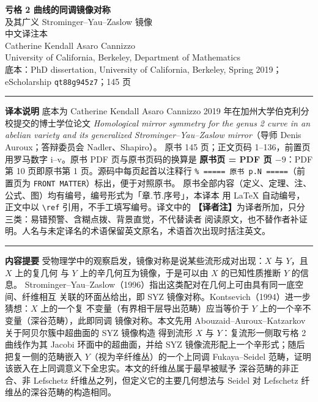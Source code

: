 



\begin{center}
  {\LARGE\bfseries 亏格 2 曲线的同调镜像对称}\\[0.6em]
  {\large 及其广义 Strominger--Yau--Zaslow 镜像}\\[1.0em]
  {\large 中文译注本}\\[1.0em]
  {\large Catherine Kendall Asaro Cannizzo}\\[0.3em]
  {\small University of California, Berkeley, Department of Mathematics}\\[1.0em]
  {\small 底本：PhD dissertation, University of California, Berkeley, Spring 2019；\\
  eScholarship \texttt{qt88g945z7}；145 页}
\end{center}

\vspace{0.6em}
\noindent\rule{\textwidth}{0.4pt}
\begin{minipage}{\textwidth}
\small
\textbf{译本说明}\quad
底本为 Catherine Kendall Asaro Cannizzo 2019 年在加州大学伯克利分校提交的博士学位论文
\emph{Homological mirror symmetry for the genus 2 curve in an abelian variety and its
generalized Strominger--Yau--Zaslow mirror}（导师 Denis Auroux；答辩委员会 Nadler、Shapiro）。
原书 145 页；正文页码 1--136，前置页用罗马数字 i--v。原书 PDF 页与原书页码的换算是
\textbf{原书页 = PDF 页 $-9$}：PDF 第 10 页即原书第 1 页。源码中每页起首以注释行
\texttt{\% ===== 原书 p.N =====}（前置页为 \texttt{FRONT MATTER}）标出，便于对照原书。
原书全部内容（定义、定理、注、公式、图）均有编号，编号形式为「章.节.序号」，本译本
用 \LaTeX{} 自动编号，正文中以 \verb|\ref| 引用，不手工填写编号。译文中的
\textbf{【译者注】}为译者所加，只分三类：易错预警、含糊点拨、背景直觉，不代替读者
阅读原文，也不替作者补证明。人名与未定译名的术语保留英文原名，术语首次出现时括注英文。
\end{minipage}
\noindent\rule{\textwidth}{0.4pt}

\vspace{1.2em}
\noindent\textbf{内容提要}\quad
受物理学中的观察启发，镜像对称是说某些流形成对出现：$X$ 与 $Y$，且 $X$ 上的复几何
与 $Y$ 上的辛几何互为镜像，于是可以由 $X$ 的已知性质推断 $Y$ 的信息。
Strominger--Yau--Zaslow（1996）指出这类配对在几何上可由具有同一底空间、纤维相互
关联的环面丛给出，即 SYZ 镜像对称。Kontsevich（1994）进一步猜想：$X$ 上的一个复
不变量（有界相干层导出范畴）应当等价于 $Y$ 上的一个辛不变量（深谷范畴），此即同调
镜像对称。本文先用 Abouzaid--Auroux--Katzarkov 关于阿贝尔簇中超曲面的 SYZ 镜像构造
得到流形 $X$ 与 $Y$：复流形一侧取亏格 2 曲线作为其 Jacobi 环面中的超曲面，并给 SYZ
镜像流形配上一个辛形式；随后把复一侧的范畴嵌入 $Y$（视为辛纤维丛）的一个上同调
Fukaya--Seidel 范畴，证明该嵌入在上同调意义下全忠实。本文的纤维丛属于最早被赋予
深谷范畴的非正合、非 Lefschetz 纤维丛之列，但定义它的主要几何想法与 Seidel 对
Lefschetz 纤维丛的深谷范畴的构造相同。


